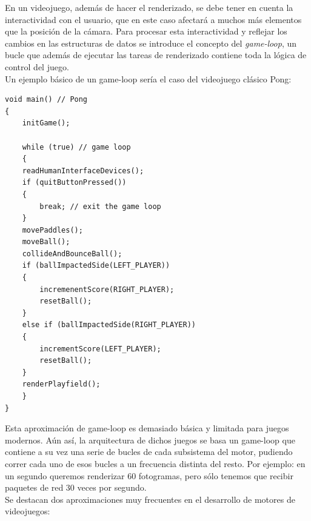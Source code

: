 \documentclass[a4paper,12pt]{report}
\begin{document}
	
	En un videojuego, además de hacer el renderizado, se debe tener en cuenta la interactividad con el usuario, que en este caso afectará a muchos más elementos que la posición de la cámara. Para procesar esta interactividad y reflejar los cambios en las estructuras de datos se introduce el concepto del \textit{game-loop}, un bucle que además de ejecutar las tareas de renderizado contiene toda la lógica de control del juego.\\
	
	 Un ejemplo básico de un game-loop sería el caso del videojuego clásico Pong:
	
		\begin{lstlisting}[style=C, numbers=none]
void main() // Pong
{
	initGame();
		
	while (true) // game loop
	{
	readHumanInterfaceDevices();
	if (quitButtonPressed())
	{
		break; // exit the game loop
	}
	movePaddles();
	moveBall();
	collideAndBounceBall();
	if (ballImpactedSide(LEFT_PLAYER))
	{
		incremenentScore(RIGHT_PLAYER);
		resetBall();
	}
	else if (ballImpactedSide(RIGHT_PLAYER))
	{
		incrementScore(LEFT_PLAYER);
		resetBall();
	}
	renderPlayfield();
	}
}
	\end{lstlisting}
	
	Esta aproximación de game-loop es demasiado básica y limitada para juegos modernos. Aún así, la arquitectura de dichos juegos se basa un game-loop que contiene a su vez una serie de bucles de cada subsistema del motor, pudiendo correr cada uno de esos bucles a un frecuencia distinta del resto. Por ejemplo: en un segundo queremos renderizar 60 fotogramas, pero sólo tenemos que recibir paquetes de red 30 veces por segundo. \\
   
	Se destacan dos aproximaciones muy frecuentes en el desarrollo de motores de videojuegos:
	
\end{document}
